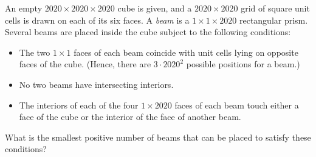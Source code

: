 An empty $2020 \times 2020 \times 2020$ cube is given, and a $2020 \times 2020$ grid of square unit cells is drawn  on each of its six faces. A \textit{beam} is a $1 \times 1 \times 2020$ rectangular prism. Several beams are placed inside the cube subject to the following conditions:
\begin{itemize}
	\item The two $1 \times 1$ faces of each beam coincide with unit cells lying on opposite faces of the cube. (Hence, there are $3 \cdot {2020}^2$ possible positions for a beam.)
	\item No two beams have intersecting interiors.
	\item The interiors of each of the four $1 \times 2020$ faces of each beam touch either a face of the cube or the interior of the face of another beam.
\end{itemize}
What is the smallest positive number of beams that can be placed to satisfy these conditions?

